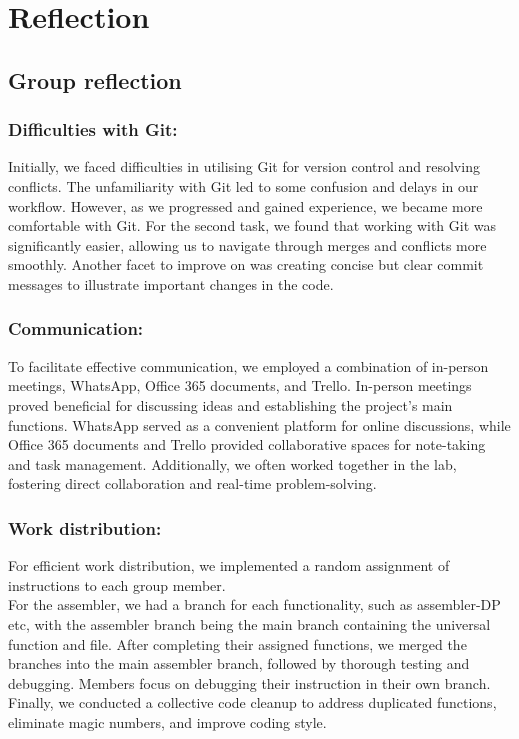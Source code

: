 \documentclass{article}
\begin{document}
\vspace{20pt}

\section{Reflection}

\subsection{Group reflection}

\subsubsection{Difficulties with Git:}

Initially, we faced difficulties in utilising Git for version control and resolving conflicts. The unfamiliarity with Git led to some confusion and delays in our workflow. However, as we progressed and gained experience, we became more comfortable with Git. For the second task, we found that working with Git was significantly easier, allowing us to navigate through merges and conflicts more smoothly. Another facet to improve on was creating concise but clear commit messages to illustrate important changes in the code.

\subsubsection{Communication:}

To facilitate effective communication, we employed a combination of in-person meetings, WhatsApp, Office 365 documents, and Trello. In-person meetings proved beneficial for discussing ideas and establishing the project's main functions. WhatsApp served as a convenient platform for online discussions, while Office 365 documents and Trello provided collaborative spaces for note-taking and task management. Additionally, we often worked together in the lab, fostering direct collaboration and real-time problem-solving. 

\subsubsection{Work distribution:}

For efficient work distribution, we implemented a random assignment of instructions to each group member.\\
For the assembler, we had a branch for each functionality, such as assembler-DP etc, with the assembler branch being the main branch containing the universal function and file. After completing their assigned functions, we merged the branches into the main assembler branch, followed by thorough testing and debugging. Members focus on debugging their instruction in their own branch. Finally, we conducted a collective code cleanup to address duplicated functions, eliminate magic numbers, and improve coding style. 
\end{document}
